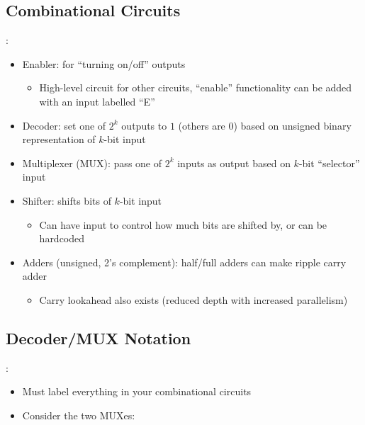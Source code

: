 \documentclass{../slides}
\begin{document}
\subsection{Combinational Circuits}
\begin{frame}{\secname: \subsecname}
    \begin{itemize}
        \item Enabler: for \enquote{turning on/off} outputs
        \begin{itemize}
            \item High-level circuit for other circuits, \enquote{enable} functionality can be added with an input labelled \enquote{E}
        \end{itemize}
        \item Decoder: set one of $2^k$ outputs to $1$ (others are $0$) based on unsigned binary representation of $k$-bit input
        \item Multiplexer (MUX): pass one of $2^k$ inputs as output based on $k$-bit \enquote{selector} input
        \item Shifter: shifts bits of $k$-bit input
        \begin{itemize}
            \item Can have input to control how much bits are shifted by, or can be hardcoded
        \end{itemize}
        \item Adders (unsigned, 2's complement): half/full adders can make ripple carry adder
        \begin{itemize}
            \item Carry lookahead also exists (reduced depth with increased parallelism)
        \end{itemize}
    \end{itemize}
\end{frame}

\subsection{Decoder/MUX Notation}
\begin{frame}{\secname: \subsecname}
    \begin{itemize}
        \item Must label everything in your combinational circuits
        \item Consider the two MUXes:
    \end{itemize}
    \begin{figure}[H]
        \centering
    \end{figure}
\end{frame}
\end{document}
